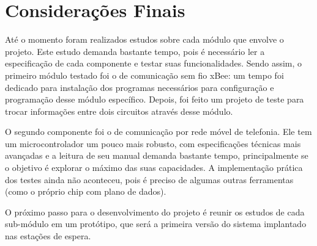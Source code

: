 \documentclass[12pt]{uftpibicsic2018}
\begin{document}
\chapter{Considerações Finais}\vskip -12pt

Até o momento foram realizados estudos sobre cada módulo que envolve o projeto. Este estudo demanda bastante tempo, pois é necessário ler a especificação de cada componente e testar suas funcionalidades. Sendo assim, o primeiro módulo testado foi o de comunicação sem fio xBee: um tempo foi dedicado para instalação dos programas necessários para configuração e programação desse módulo específico. Depois, foi feito um projeto de teste para trocar informações entre dois circuitos através desse módulo.

O segundo componente foi o de comunicação por rede móvel de telefonia. Ele tem um microcontrolador um pouco mais robusto, com especificações técnicas mais avançadas e a leitura de seu manual demanda bastante tempo, principalmente se o objetivo é explorar o máximo das suas capacidades. A implementação prática dos testes ainda não aconteceu, pois é preciso de algumas outras ferramentas (como o próprio chip com plano de dados).



O próximo passo para o desenvolvimento do projeto é reunir os estudos de cada sub-módulo em um protótipo, que será a primeira versão do sistema implantado nas estações de espera.

%

\end{document}
